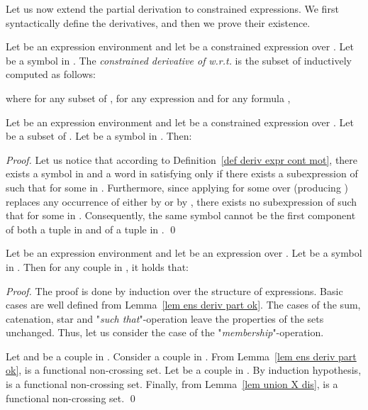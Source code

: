 \documentclass[a4paper]{llncs}
\begin{document}
  Let us now extend the partial derivation to constrained expressions. 
  We first syntactically define the derivatives, and then we prove their existence.


  \begin{definition}\label{def deriv expr cont exp}
    Let  be an expression environment and let  be a constrained expression over . Let  be a symbol in . The \emph{constrained derivative of}  \emph{w.r.t.}  is the subset  of  inductively computed as follows:
    
    where for any subset  of , for any expression  and for any formula ,
    
  \end{definition}
\begin{lemma}\label{lem union X dis}
    Let  be an expression environment and let  be a constrained expression over . Let  be a subset of . Let  be a symbol in . Then:
        
  
  \end{lemma}
  \begin{proof}
    Let us notice that according to Definition~\ref{def deriv expr cont mot}, there exists a symbol  in  and a word  in  satisfying  only if there exists a subexpression  of  such that  for some  in .    
    Furthermore, since applying  for some  over  (producing ) replaces any occurrence of  either by  or by , there exists no subexpression  of  such that  for some  in .    
    Consequently, the same symbol  cannot be the first component of both a tuple in  and of a tuple in .
    \qed
  \end{proof}
  
  \begin{lemma}
    Let  be an expression environment and let  be an expression over . 
    Let  be a symbol in . 
    Then for any couple  in , it holds that:
    
  \end{lemma}
  \begin{proof}
    The proof is done by induction over the structure of expressions.
    Basic cases are well defined from Lemma~\ref{lem ens deriv part ok}.
    The cases of the sum, catenation, star and "\emph{such that}"-operation leave the properties of the sets unchanged.
    Thus, let us consider the case of the "\emph{membership}"-operation.
    
    Let  and  be a couple in .
    Consider a couple  in .
    From Lemma~\ref{lem ens deriv part ok},  is a functional non-crossing set.
    Let  be a couple in .
    By induction hypothesis,   is a functional non-crossing set.
    Finally, from Lemma~\ref{lem union X dis},  is a functional non-crossing set.
    \qed
  \end{proof}
  
\end{document}
